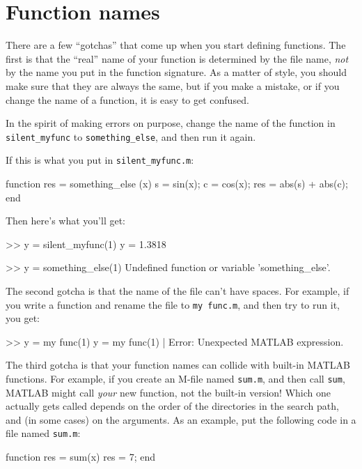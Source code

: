 \documentclass[
]{book}
\numberwithin{Answer}{chapter}
\numberwithin{Exercise}{chapter}
\begin{document}
\section{Function names}

There are a few ``gotchas'' that come up when you start defining functions.
The first is that the ``real'' name of your function is determined by the file name, {\em not} by the name you put in the function signature.  As a matter of style, you
should make sure that they are always the same, but if you
make a mistake, or if you change the name of a function, it is
easy to get confused.

In the spirit of making errors on purpose, change the name of
the function in \verb"silent_myfunc" to \verb"something_else", and
then run it again.

If this is what you put in \verb"silent_myfunc.m":

\begin{code}
function res = something_else (x)
    s = sin(x);
    c = cos(x);
    res = abs(s) + abs(c);
end
\end{code}

Then here's what you'll get:

\begin{code}
>> y = silent_myfunc(1)
y = 1.3818

>> y = something_else(1)
Undefined function or variable 'something_else'.
\end{code}

The second gotcha is that the name of the file can't have spaces.
For example, if you write a function and rename the file to {\tt my func.m},
and then try to run it, you get:

\begin{code}
>> y = my func(1)
 y = my func(1)
        |
Error: Unexpected MATLAB expression.
\end{code}

The third gotcha is that your function names can collide with built-in
MATLAB functions.  For example, if you create an M-file named {\tt sum.m}, and then call {\tt sum}, MATLAB might call {\em your} new
function, not the built-in version!  Which one actually gets called
depends on the order of the directories in the search path, and
(in some cases) on the arguments.  As an example, put the following
code in a file named {\tt sum.m}:

\begin{code}
function res = sum(x)
   res = 7;
end
\end{code}
\end{document}

